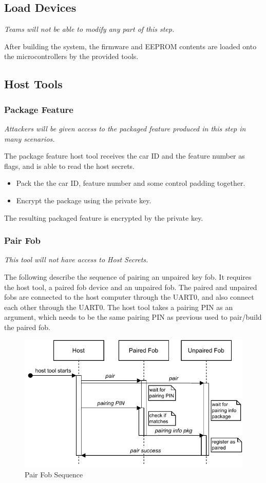 \documentclass[11pt,oneside,onecolumn,letterpaper]{article}
\begin{document}
\subsection{Load Devices}

\textit{Teams will not be able to modify any part of this step.}

After building the system, the firmware and EEPROM contents are loaded onto the microcontrollers by the provided tools.

\subsection{Host Tools}

\subsubsection{Package Feature}

\textit{Attackers will be given access to the packaged feature produced in this step in many scenarios.}

The package feature host tool receives the car ID and the feature number as flags, and is able to read the host secrets.
\begin{itemize}
	\item Pack the the car ID, feature number and some control padding together.
	\item Encrypt the package using the private key.
\end{itemize}

The resulting packaged feature is encrypted by the private key.

\subsubsection{Pair Fob}

\textit{This tool will not have access to Host Secrets.}

The following describe the sequence of pairing an unpaired key fob. It requires the host tool, a paired fob device and an unpaired fob. The paired and unpaired fobs are connected to the host computer through the UART0, and also connect each other through the UART0. The host tool takes a pairing PIN as an argument, which needs to be the same pairing PIN as previous used to pair/build the paired fob.

\begin{figure}[!htbp]
	\begin{centering}
		\includegraphics[width = .6\textwidth]{pic/pair.pdf}
		\caption{Pair Fob Sequence}
		\label{fig:pair}
	\end{centering}
\end{figure}
\end{document}
